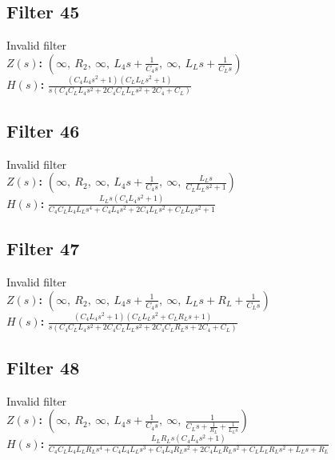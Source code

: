 \documentclass{article}
\begin{document}
\subsection*{Filter 45}
Invalid filter \\ 
\textbf{$Z(s)$:} $\left( \infty, \  R_{2}, \  \infty, \  L_{4} s + \frac{1}{C_{4} s}, \  \infty, \  L_{L} s + \frac{1}{C_{L} s}\right)$ \\ 
\textbf{$H(s)$:} $\frac{\left(C_{4} L_{4} s^{2} + 1\right) \left(C_{L} L_{L} s^{2} + 1\right)}{s \left(C_{4} C_{L} L_{4} s^{2} + 2 C_{4} C_{L} L_{L} s^{2} + 2 C_{4} + C_{L}\right)}$ \\ 
\subsection*{Filter 46}
Invalid filter \\ 
\textbf{$Z(s)$:} $\left( \infty, \  R_{2}, \  \infty, \  L_{4} s + \frac{1}{C_{4} s}, \  \infty, \  \frac{L_{L} s}{C_{L} L_{L} s^{2} + 1}\right)$ \\ 
\textbf{$H(s)$:} $\frac{L_{L} s \left(C_{4} L_{4} s^{2} + 1\right)}{C_{4} C_{L} L_{4} L_{L} s^{4} + C_{4} L_{4} s^{2} + 2 C_{4} L_{L} s^{2} + C_{L} L_{L} s^{2} + 1}$ \\ 
\subsection*{Filter 47}
Invalid filter \\ 
\textbf{$Z(s)$:} $\left( \infty, \  R_{2}, \  \infty, \  L_{4} s + \frac{1}{C_{4} s}, \  \infty, \  L_{L} s + R_{L} + \frac{1}{C_{L} s}\right)$ \\ 
\textbf{$H(s)$:} $\frac{\left(C_{4} L_{4} s^{2} + 1\right) \left(C_{L} L_{L} s^{2} + C_{L} R_{L} s + 1\right)}{s \left(C_{4} C_{L} L_{4} s^{2} + 2 C_{4} C_{L} L_{L} s^{2} + 2 C_{4} C_{L} R_{L} s + 2 C_{4} + C_{L}\right)}$ \\ 
\subsection*{Filter 48}
Invalid filter \\ 
\textbf{$Z(s)$:} $\left( \infty, \  R_{2}, \  \infty, \  L_{4} s + \frac{1}{C_{4} s}, \  \infty, \  \frac{1}{C_{L} s + \frac{1}{R_{L}} + \frac{1}{L_{L} s}}\right)$ \\ 
\textbf{$H(s)$:} $\frac{L_{L} R_{L} s \left(C_{4} L_{4} s^{2} + 1\right)}{C_{4} C_{L} L_{4} L_{L} R_{L} s^{4} + C_{4} L_{4} L_{L} s^{3} + C_{4} L_{4} R_{L} s^{2} + 2 C_{4} L_{L} R_{L} s^{2} + C_{L} L_{L} R_{L} s^{2} + L_{L} s + R_{L}}$ \\ 
\end{document}
